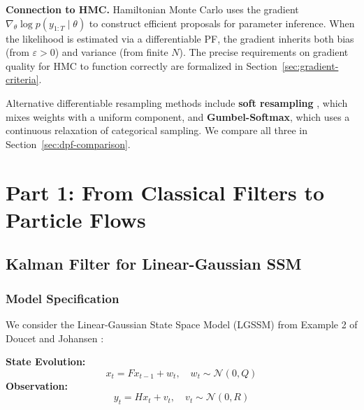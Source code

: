 \documentclass[12pt,a4paper]{article}
\theoremstyle{definition}
\theoremstyle{remark}
\newcommand{\N}{\mathcal{N}}
\begin{document}
\textbf{Connection to HMC.} Hamiltonian Monte Carlo \citep{neal2011} uses the gradient $\nabla_\theta \log p(y_{1:T} \mid \theta)$ to construct efficient proposals for parameter inference. When the likelihood is estimated via a differentiable PF, the gradient inherits both bias (from $\varepsilon > 0$) and variance (from finite $N$). The precise requirements on gradient quality for HMC to function correctly are formalized in Section~\ref{sec:gradient-criteria}.

Alternative differentiable resampling methods include \textbf{soft resampling} \citep{chen2023}, which mixes weights with a uniform component, and \textbf{Gumbel-Softmax}, which uses a continuous relaxation of categorical sampling. We compare all three in Section~\ref{sec:dpf-comparison}.


\section{Part 1: From Classical Filters to Particle Flows}
\label{sec:part1}

\subsection{Kalman Filter for Linear-Gaussian SSM}
\label{sec:kalman-filter}

\subsubsection{Model Specification}

We consider the Linear-Gaussian State Space Model (LGSSM) from Example 2 of Doucet and Johansen \citep{doucet2009}:

\begin{tcolorbox}[colback=gray!5!white,colframe=gray!50!black,title=LGSSM Definition]
	\textbf{State Evolution:}
	\begin{equation}
		x_t = F x_{t-1} + w_t, \quad w_t \sim \N(0, Q)
	\end{equation}
	\textbf{Observation:}
	\begin{equation}
		y_t = H x_t + v_t, \quad v_t \sim \N(0, R)
	\end{equation}
\end{tcolorbox}
\end{document}
